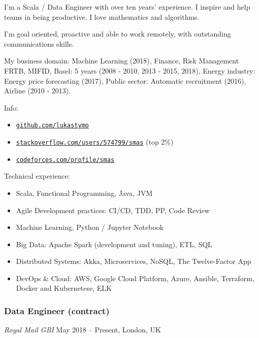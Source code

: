 \documentclass[]{rss}
\date{}
\providecommand{\tightlist}{%
  \setlength{\itemsep}{0pt}\setlength{\parskip}{0pt}}
\begin{document}
\address{\\[-9pt] lukas@codeily.com | lukastymo.com}
\begin{resume}

I'm a Scala / Data Engineer with over ten years' experience. I inspire
and help teams in being productive. I love mathematics and algorithms.

I'm goal oriented, proactive and able to work remotely, with outstanding
communications skills.

My business domain: Machine Learning (2018), Finance, Risk Management
FRTB, MIFID, Basel: 5 years (2008 - 2010, 2013 - 2015, 2018), Energy
industry: Energy price forecasting (2017), Public sector: Automatic
recruitment (2016), Airline (2010 - 2013).

Info:

\begin{itemize}
\tightlist
\item
  \href{https://github.com/lukastymo}{\texttt{github.com/lukastymo}}
\item
  \href{https://stackoverflow.com/users/574799/smas}{\texttt{stackoverflow.com/users/574799/smas}}
  (top 2\%)
\item
  \href{https://codeforces.com/profile/smas}{\texttt{codeforces.com/profile/smas}}
\end{itemize}

Technical experience:

\begin{itemize}
\tightlist
\item
  Scala, Functional Programming, Java, JVM
\item
  Agile Development practices: CI/CD, TDD, PP, Code Review
\item
  Machine Learning, Python / Jupyter Notebook
\item
  Big Data: Apache Spark (development and tuning), ETL, SQL
\item
  Distributed Systems: Akka, Microservices, NoSQL, The Twelve-Factor App
\item
  DevOps \& Cloud: AWS, Google Cloud Platform, Azure, Ansible,
  Terraform, Docker and Kubernetese, ELK
\end{itemize}

\subsubsection{Data Engineer (contract)}\label{data-engineer-contract}

\emph{Royal Mail \textbar{} GBI} May 2018 -- Present, London, UK


\end{resume}
\end{document}
